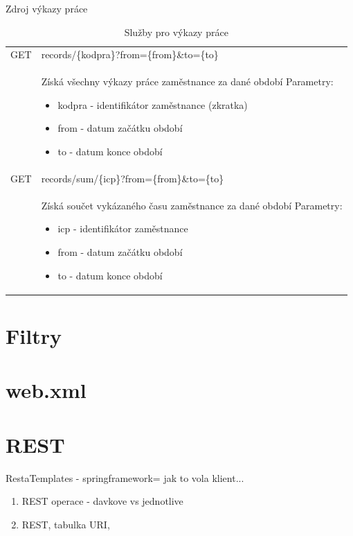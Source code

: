 \documentclass{diplomka}
\begin{document}
Zdroj výkazy práce
\begin{table}[H]
\begin{center}
\begin{tabular}{| m{2cm} |  m{10cm} |}
\hline
\rowcolor{Gray}
GET  &records/\{kodpra\}?from=\{from\}\&to=\{to\} \\ 
&  \parbox{10cm}{Získá všechny výkazy práce zaměstnance za dané období\\
Parametry:\begin{itemize}[noitemsep,nolistsep]
\item kodpra - identifikátor zaměstnance (zkratka)
\item from - datum začátku období
\item to - datum konce období
\end{itemize}} \\ \hline
{}
GET & records/sum/\{icp\}?from=\{from\}\&to=\{to\} \\ \hline
&  \parbox{10cm}{Získá součet vykázaného času zaměstnance za dané období\\
Parametry:\begin{itemize}[noitemsep,nolistsep]
\item icp - identifikátor zaměstnance
\item from - datum začátku období
\item to - datum konce období
\end{itemize}} \\ \hline
\end{tabular}
\end{center}
\caption{Služby pro výkazy práce}
\label{tab:urirecords}
\end{table}

\section{Filtry}

\section{web.xml}

\section{REST}
RestaTemplates - springframework= jak to vola klient...
\begin{enumerate}
\item REST operace - davkove vs jednotlive
\item REST, tabulka URI, 
\end{enumerate}
\end{document}
